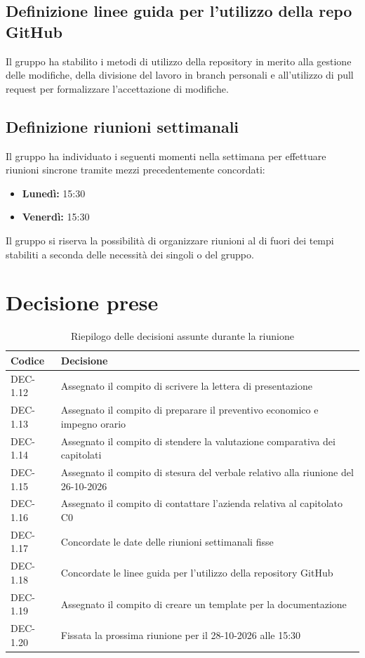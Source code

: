\documentclass[11pt, a4paper]{article}
\begin{document}
\subsection{Definizione linee guida per l'utilizzo della repo GitHub}
Il gruppo ha stabilito i metodi di utilizzo della repository in merito alla gestione delle modifiche, della divisione del lavoro in branch personali e all'utilizzo di pull request per formalizzare l'accettazione di modifiche.

\subsection{Definizione riunioni settimanali}
Il gruppo ha individuato i seguenti momenti nella settimana per effettuare riunioni sincrone tramite mezzi precedentemente concordati:
\begin{itemize}
    \item \textbf{Lunedì:} 15:30
    \item \textbf{Venerdì:} 15:30
\end{itemize}
Il gruppo si riserva la possibilità di organizzare riunioni al di fuori dei tempi stabiliti a seconda delle necessità dei singoli o del gruppo.
\\

\section{Decisione prese}
\begin{table}[htbp]
\centering
\caption{Riepilogo delle decisioni assunte durante la riunione}
\label{tab:decisioni}
\begin{tabularx}{\textwidth}{l X}
\toprule
\textbf{Codice} & \textbf{Decisione} \\
\midrule
DEC-1.12 & Assegnato il compito di scrivere la lettera di presentazione \\
DEC-1.13 & Assegnato il compito di preparare il preventivo economico e impegno orario \\
DEC-1.14 & Assegnato il compito di stendere la valutazione comparativa dei capitolati \\
DEC-1.15 & Assegnato il compito di stesura del verbale relativo alla riunione del 26-10-2026\\
DEC-1.16 & Assegnato il compito di contattare l'azienda relativa al capitolato C0 \\
DEC-1.17 & Concordate le date delle riunioni settimanali fisse \\
DEC-1.18 & Concordate le linee guida per l'utilizzo della repository GitHub \\
DEC-1.19 & Assegnato il compito di creare un template per la documentazione \\
DEC-1.20 & Fissata la prossima riunione per il 28-10-2026 alle 15:30 \\
\bottomrule
\end{tabularx}
\end{table}
\end{document}
